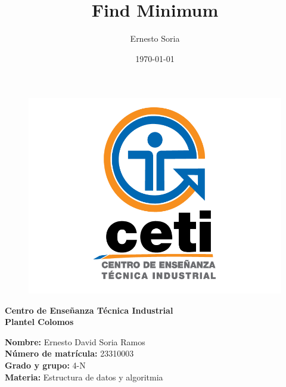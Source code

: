 \documentclass{article}
\title{\Huge \bfseries Find Minimum}
\author{Ernesto Soria}
\date{\today} %
\begin{document}
	
	\maketitle %
	
	
	
	
	\begin{figure}[h] %
		\centering
		\includegraphics[width=1\textwidth]{cetilogo.png} %
		\label{fig:ceti} %
	\end{figure}
	
	\begin{center}
		{\LARGE \textbf{Centro de Enseñanza Técnica Industrial}} \\[2.5mm]
		{\LARGE \textbf{Plantel Colomos}}\\
	\end{center}
	
	\vspace{5mm} %
	
	\begin{flushleft}
		{\large \textbf{Nombre:} Ernesto David Soria Ramos} \\[2mm]
		{\large \textbf{Número de matrícula:} 23310003} \\[2mm]
		{\large \textbf{Grado y grupo:} 4-N}\\[2mm]
		{\large \textbf{Materia:} Estructura de datos y algoritmia }\\[2mm]
	\end{flushleft}
	
\end{document}
